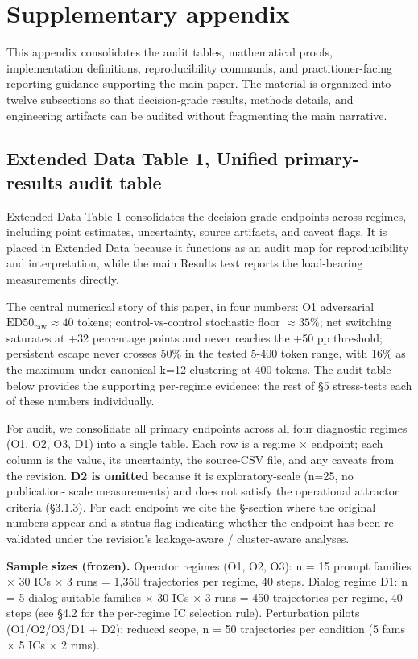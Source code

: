 \documentclass{article}
\theoremstyle{plain}
\theoremstyle{definition}
\begin{document}
\section{Supplementary appendix}

This appendix consolidates the audit tables, mathematical proofs, implementation definitions, reproducibility commands, and practitioner-facing reporting guidance supporting the main paper. The material is organized into twelve subsections so that decision-grade results, methods details, and engineering artifacts can be audited without fragmenting the main narrative.

\subsection{Extended Data Table 1, Unified primary-results audit table}

Extended Data Table 1 consolidates the decision-grade endpoints across
regimes, including point estimates, uncertainty, source artifacts, and
caveat flags. It is placed in Extended Data because it functions as an
audit map for reproducibility and interpretation, while the main
Results text reports the load-bearing measurements directly.

The central numerical story of this paper, in four numbers: O1 adversarial $\mathrm{ED50}_{\mathrm{raw}} \approx 40$ tokens; control-vs-control stochastic floor $\approx 35\%$; net switching saturates at +32 percentage points and never reaches the +50 pp threshold; persistent escape never crosses 50\% in the tested 5-400 token range, with 16\% as the maximum under canonical k=12 clustering at 400 tokens. The audit table below provides the supporting per-regime evidence; the rest of §5 stress-tests each of these numbers individually.

For audit, we consolidate all primary endpoints across all four
diagnostic regimes (O1, O2, O3, D1) into a single table. Each row
is a regime × endpoint; each column is the value, its uncertainty,
the source-CSV file, and any caveats from the revision. \textbf{D2 is
omitted} because it is exploratory-scale (n=25, no publication-
scale measurements) and does not satisfy the operational attractor
criteria (§3.1.3). For each endpoint we cite the §-section where
the original numbers appear and a status flag indicating whether
the endpoint has been re-validated under the revision's
leakage-aware / cluster-aware analyses.

\textbf{Sample sizes (frozen).} Operator regimes (O1, O2, O3): n =
15 prompt families × 30 ICs × 3 runs = 1,350 trajectories per
regime, 40 steps. Dialog regime D1: n = 5 dialog-suitable families
× 30 ICs × 3 runs = 450 trajectories per regime, 40 steps (see
§4.2 for the per-regime IC selection rule). Perturbation pilots
(O1/O2/O3/D1 + D2): reduced scope, n = 50 trajectories per
condition (5 fams × 5 ICs × 2 runs).
\end{document}
